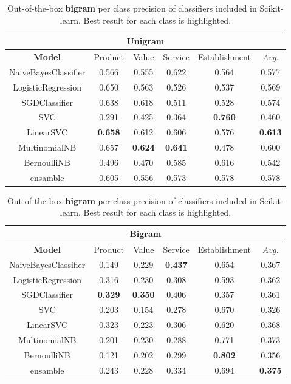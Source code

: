 \documentclass[a4paper,11pt]{kth-mag}
\begin{document}
\begin{table}[h]
  \centering
  \begin{tabular}{| c | c | c | c | c || c |}
    \hline
    \multicolumn{6}{|c|}{Unigram} \\
    \hline
    \textbf{Model} & Product & Value & Service & Establishment & \emph{Avg.} \\ \hline
    NaiveBayesClassifier& 0.566 & 0.555 & 0.622 & 0.564 & 0.577 \\
    LogisticRegression  & 0.650 & 0.563 & 0.526 & 0.537 & 0.569 \\
    SGDClassifier       & 0.638 & 0.618 & 0.511 & 0.528 & 0.574 \\
    SVC                 & 0.291 & 0.425 & 0.364 & \textbf{0.760} & 0.460 \\
    LinearSVC           & \textbf{0.658} & 0.612 & 0.606 & 0.576 & \textbf{0.613} \\
    MultinomialNB       & 0.657 & \textbf{0.624} & \textbf{0.641} & 0.478 & 0.600 \\
    BernoulliNB         & 0.496 & 0.470 & 0.585 & 0.616 & 0.542 \\
    \hline
    ensamble            & 0.605 & 0.556 & 0.573 & 0.578 & 0.578 \\
    \hline
  \end{tabular}
  \caption{Out-of-the-box \textbf{unigram} per class precision of classifiers included in Scikit-learn.
    Best result for each class is highlighted.
  }
  \label{tab:individual_unigram_accuracy}

  \begin{tabular}{| c | c | c | c | c || c |}
    \hline
    \multicolumn{6}{|c|}{Bigram} \\
    \hline
    \textbf{Model} & Product & Value & Service & Establishment & \emph{Avg.} \\ \hline
    NaiveBayesClassifier& 0.149 & 0.229 & \textbf{0.437} & 0.654 & 0.367 \\
    LogisticRegression  & 0.316 & 0.230 & 0.308 & 0.593 & 0.362 \\
    SGDClassifier       & \textbf{0.329} & \textbf{0.350} & 0.406 & 0.357 & 0.361 \\
    SVC                 & 0.203 & 0.154 & 0.278 & 0.670 & 0.326 \\
    LinearSVC           & 0.323 & 0.223 & 0.306 & 0.620 & 0.368 \\
    MultinomialNB       & 0.201 & 0.230 & 0.288 & 0.771 & 0.373 \\
    BernoulliNB         & 0.121 & 0.202 & 0.299 & \textbf{0.802} & 0.356 \\
    \hline
    ensamble            & 0.243 & 0.228 & 0.334 & 0.694 & \textbf{0.375}\\
    \hline
  \end{tabular}
  \caption{Out-of-the-box \textbf{bigram} per class precision of classifiers
    included in Scikit-learn. Best result for each class is highlighted.
  }
  \label{tab:individual_bigram_accuracy}
\end{table}
\end{document}
